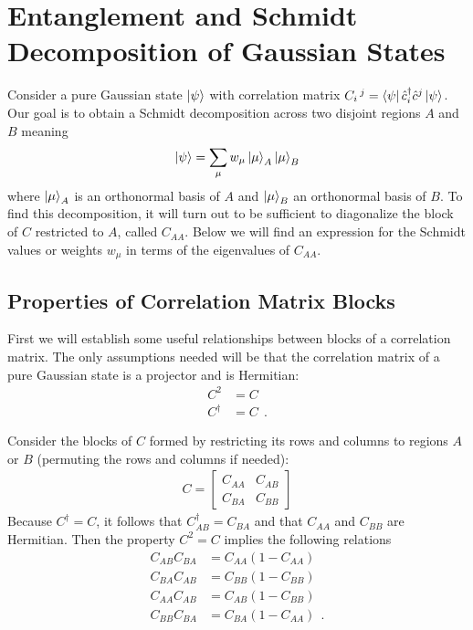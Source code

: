 \documentclass[aps, superscriptaddress, floatfix, onecolumn]{revtex4-2}
\begin{document}
\section{Entanglement and Schmidt Decomposition of Gaussian States}

Consider a pure Gaussian state $\ket{\psi}$ with correlation matrix $C_i\,^j = \bra{\psi} \hat{c}^\dagger_i \hat{c}^j \ket{\psi}$. 
Our goal is to obtain a Schmidt decomposition across two disjoint regions $A$ and $B$ meaning 
\begin{align}
\ket{\psi} = \sum_\mu w_\mu \ket{\mu}_A \ket{\mu}_B \label{eq:schmidt}
\end{align}
where $\ket{\mu}_A$ is an orthonormal basis of $A$ and  $\ket{\mu}_B$ an orthonormal basis of $B$. 
To find this decomposition, it will turn out to be sufficient to diagonalize the block of $C$ restricted to $A$, called $C_{AA}$. Below we will find an
expression for the Schmidt values or weights $w_\mu$ in terms of the eigenvalues of $C_{AA}$.

\subsection{Properties of Correlation Matrix Blocks}

First we will establish some useful relationships between blocks of a correlation matrix. The only assumptions needed will be that the correlation matrix of
a pure Gaussian state is a projector and is Hermitian:
\begin{align}
C^2 & = C \label{eq:projector} \\
C^\dagger & = C \ \ . \label{eq:hermitian}
\end{align}

Consider the blocks of $C$ formed by restricting its rows and columns to regions $A$ or $B$ (permuting the rows and columns if needed):
\begin{align}
C = \begin{bmatrix}
C_{AA} & C_{AB} \\ 
C_{BA} & C_{BB} 
\end{bmatrix}
\end{align}
Because $C^\dagger = C$, it follows that $C^\dagger_{AB} = C_{BA}$ and that $C_{AA}$ and $C_{BB}$ are Hermitian.
Then the property $C^2=C$ implies the following relations
\begin{align}
C_{AB} C_{BA} & = C_{AA} (1- C_{AA})  \label{eq:proj1} \\
C_{BA} C_{AB} & = C_{BB} (1 - C_{BB}) \\
C_{AA} C_{AB} & = C_{AB} (1 - C_{BB}) \\
C_{BB} C_{BA} & = C_{BA} (1 - C_{AA})  \ \ .
\end{align}
\end{document}
